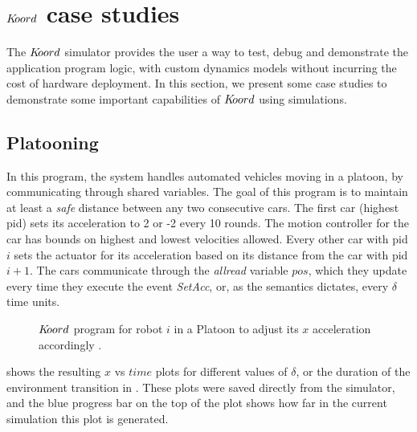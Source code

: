 \section{$K\kern-2pt oord$ case studies}

The $K\kern-2pt oord$ simulator provides the user a way to test, debug and demonstrate the application program logic, with custom dynamics models without incurring the cost of hardware deployment. In this section, we present some case studies to demonstrate some important capabilities of $K\kern-2pt oord$ using simulations. 
\subsection{Platooning}
\label{sec:platooning}
In this program, the system handles automated vehicles moving in a platoon, by communicating through shared variables. The goal of this program is to maintain at least a \emph{safe} distance between any two consecutive cars. The first car (highest pid) sets its acceleration to 2 or -2 every 10 rounds. The motion controller for the car has bounds on highest and lowest velocities allowed. Every other car with pid $i$ sets the actuator for its acceleration based on its distance from the car with pid $i+1$. The cars communicate through the \emph{allread} variable $\mathit{pos}$, which they update every time they execute the event \emph{SetAcc}, or, as the semantics dictates, every $\delta$ time units.

\begin{figure}[ht!]
    \noindent
    \begin{center}
        \scriptsize
        {}
        {}
    \end{center}
    \caption{$K\kern-2pt oord$ program for robot $i$ in a Platoon to adjust its $x$ acceleration accordingly .}
    \label{fig:platooningapp}
\end{figure}


 shows the resulting $x$ vs $\mathit{time}$ plots for different values of $\delta$, or the duration of the environment transition in . These plots were saved directly from the simulator, and the blue progress bar on the top of the plot shows how far in the current simulation this plot is generated.

